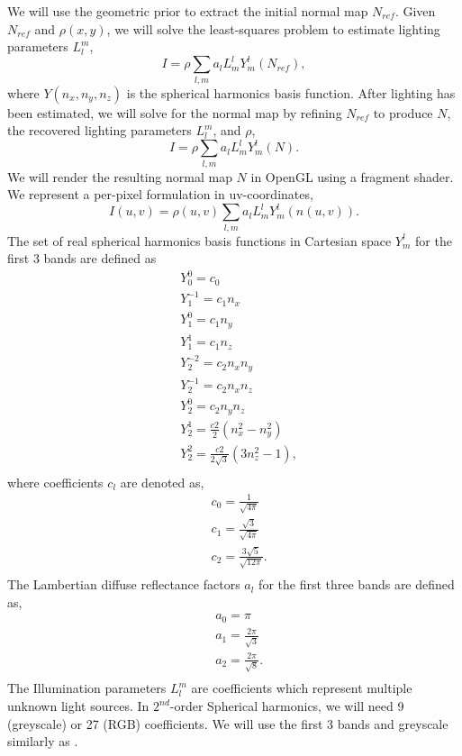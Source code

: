 \documentclass[10pt,twocolumn,letterpaper]{article}
\begin{document}
We will use the geometric prior to extract the initial normal map $N_{ref}$.  Given $N_{ref}$ and $\rho(x,y)$, we will solve the least-squares problem to estimate lighting parameters $L_l^m$,
\begin{equation}
I = \rho \sum_{l,m} a_l L_m^l Y_m^l(N_{ref}),
\end{equation}
where $Y(n_x,n_y,n_z)$ is the spherical harmonics basis function. After lighting has been estimated, we will solve for the normal map by refining $N_{ref}$ to produce $N$, the recovered lighting parameters $L_l^m$, and $\rho$,
\begin{equation}
I = \rho \sum_{l,m} a_l L_m^l Y_m^l(N).
\end{equation}
We will render the resulting normal map $N$ in OpenGL using a fragment shader. We represent a per-pixel formulation in uv-coordinates,
\begin{equation}
I(u,v) = \rho(u,v) \sum_{l,m} a_l L_m^l Y_m^l(n(u,v)).
\end{equation}
The set of real spherical harmonics basis functions in Cartesian space $Y_m^l$ for the first 3 bands are defined \cite{sfs} as 
\begin{equation}
\begin{split}
&Y_0^0 = c_0\\
&Y_1^{-1} = c_1 n_x\\
&Y_1^{0} = c_1 n_y\\
&Y_1^{1} = c_1 n_z\\
&Y_2^{-2} = c_2 n_x n_y\\
&Y_2^{-1} = c_2 n_x n_z\\
&Y_2^{0} = c_2 n_y n_z\\
&Y_2^{1} = \frac{c2}{2}(n_x^2 - n_y^2)\\
&Y_2^{2} = \frac{c2}{2\sqrt{3}}(3n_z^2 - 1),\\
\end{split}
\end{equation}
where coefficients $c_l$ are denoted as,
\begin{equation}
\begin{split}
&c_0 = \frac{1}{\sqrt{4\pi}}\\
&c_1 = \frac{\sqrt{3}}{\sqrt{4\pi}}\\
&c_2 = \frac{3\sqrt{5}}{\sqrt{12\pi}}.\\
\end{split}
\end{equation}
The Lambertian diffuse reflectance factors $a_l$ for the first three bands are defined as,
\begin{equation}
\begin{split}
&a_0 = \pi\\
&a_1 = \frac{2\pi}{\sqrt{3}}\\
&a_2 = \frac{2\pi}{\sqrt{8}}.\\
\end{split}
\end{equation}
The Illumination parameters $L_l^m$ are coefficients which represent multiple unknown light sources. In $2^{nd}$-order Spherical harmonics, we will need 9 (greyscale) or 27 (RGB) coefficients. We will use the first 3 bands and greyscale similarly as \cite{sfs}.
\end{document}
